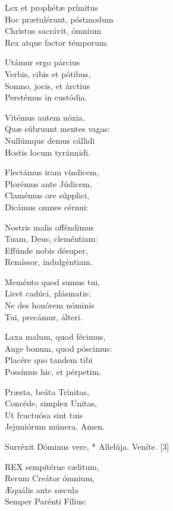 Lex et prophétæ prímitus\\
Hoc prætulérunt, póstmodum\\
Christus sacrávit, ómnium\\
Rex atque factor témporum.

Utámur ergo párcius\\
Verbis, cibis et pótibus,\\
Somno, jocis, et árctius\\
Perstémus in custódia.

Vitémus autem nóxia,\\
Quæ súbruunt mentes vagas:\\
Nullúmque demus cállidi\\
Hostis locum tyránnidi.

Flectámus iram víndicem,\\
Plorémus ante Júdicem,\\
Clamémus ore súpplici,\\
Dicámus omnes cérnui:

Nostris malis offéndimus\\
Tuam, Deus, cleméntiam:\\
Effúnde nobis désuper,\\
Remíssor, indulgéntiam.

Meménto quod sumus tui,\\
Licet cadúci, plásmatis:\\
Ne des honórem nóminis\\
Tui, precámur, álteri.

Laxa malum, quod fécimus,\\
Auge bonum, quod póscimus:\\
Placére quo tandem tibi\\
Possímus hic, et pérpetim.

Præsta, beáta Trínitas,\\
Concéde, simplex Unitas,\\
Ut fructuósa sint tuis\\
Jejuniórum múnera. Amen.


 Surréxit Dóminus vere, * Allelúja.  Veníte. [3]


\lettrine[lines=2]{R}{EX} sempitérne cælitum,\\
Rerum Creátor ómnium,\\
Æquális ante sæcula\\
Semper Parénti Fílius:

